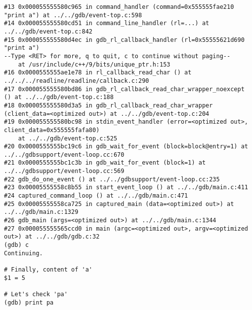 \documentclass{report}
\begin{document}
\begin{verbatim}
#13 0x000055555580c965 in command_handler (command=0x555555fae210 "print a") at ../../gdb/event-top.c:598
#14 0x000055555580cd51 in command_line_handler (rl=...) at ../../gdb/event-top.c:842
#15 0x000055555580d4ec in gdb_rl_callback_handler (rl=0x55555621d690 "print a")
--Type <RET> for more, q to quit, c to continue without paging--
    at /usr/include/c++/9/bits/unique_ptr.h:153
#16 0x0000555555ae1e78 in rl_callback_read_char () at ../../../readline/readline/callback.c:290
#17 0x000055555580bd86 in gdb_rl_callback_read_char_wrapper_noexcept () at ../../gdb/event-top.c:188
#18 0x000055555580d3a5 in gdb_rl_callback_read_char_wrapper (client_data=<optimized out>) at ../../gdb/event-top.c:204
#19 0x000055555580bc98 in stdin_event_handler (error=<optimized out>, client_data=0x555555fafa80)
    at ../../gdb/event-top.c:525
#20 0x0000555555bc19c6 in gdb_wait_for_event (block=block@entry=1) at ../../gdbsupport/event-loop.cc:670
#21 0x0000555555bc1c3b in gdb_wait_for_event (block=1) at ../../gdbsupport/event-loop.cc:569
#22 gdb_do_one_event () at ../../gdbsupport/event-loop.cc:235
#23 0x00005555558c8b55 in start_event_loop () at ../../gdb/main.c:411
#24 captured_command_loop () at ../../gdb/main.c:471
#25 0x00005555558ca725 in captured_main (data=<optimized out>) at ../../gdb/main.c:1329
#26 gdb_main (args=<optimized out>) at ../../gdb/main.c:1344
#27 0x000055555565ccd0 in main (argc=<optimized out>, argv=<optimized out>) at ../../gdb/gdb.c:32
(gdb) c
Continuing.

# Finally, content of 'a'
$1 = 5

# Let's check 'pa'
(gdb) print pa


\end{verbatim}
\end{document}
